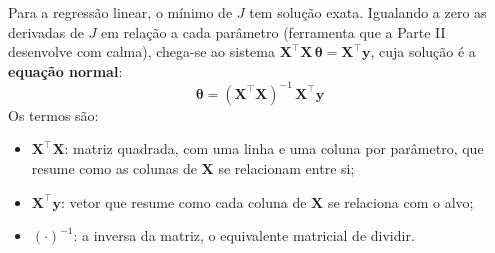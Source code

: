 \documentclass[a4paper,12pt,openany]{book}
\begin{document}
Para a regressão linear, o mínimo de \(J\) tem solução exata. Igualando a zero as derivadas de \(J\) em relação a cada parâmetro (ferramenta que a Parte II desenvolve com calma), chega-se ao sistema \(\mathbf{X}^\top\mathbf{X}\,\boldsymbol{\theta} = \mathbf{X}^\top\mathbf{y}\), cuja solução é a \textbf{equação normal}:
\begin{equation}\label{eq:equacao_normal}
\boldsymbol{\theta} = (\mathbf{X}^\top\mathbf{X})^{-1}\,\mathbf{X}^\top\mathbf{y}
\end{equation}
Os termos são:
\begin{itemize}
    \item \(\mathbf{X}^\top\mathbf{X}\): matriz quadrada, com uma linha e uma coluna por parâmetro, que resume como as colunas de \(\mathbf{X}\) se relacionam entre si;
    \item \(\mathbf{X}^\top\mathbf{y}\): vetor que resume como cada coluna de \(\mathbf{X}\) se relaciona com o alvo;
    \item \((\cdot)^{-1}\): a inversa da matriz, o equivalente matricial de dividir.
\end{itemize}
\end{document}
